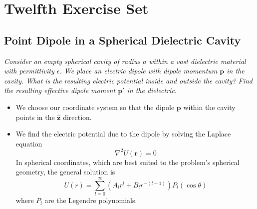 \documentclass[11pt, a4paper]{article}
\renewcommand{\vec}[1]{\bm{#1}} %
\newcommand{\uvec}[1]{\hat{\vec{#1}}} %
\renewcommand{\r}{\vec{r}}
\newcommand{\e}{\epsilon}
\newcommand{\pe}{\vec{p}}  %
\renewcommand{\laplacian}{\nabla^{2}}
\begin{document}
\section{Twelfth Exercise Set}
\subsection{Point Dipole in a Spherical Dielectric Cavity}
\textit{Consider an empty spherical cavity of radius $ a $ within a vast dielectric material with permittivity $ \e $. We place an electric dipole with dipole momentum $ \pe $ in the cavity. What is the resulting electric potential inside and outside the cavity? Find the resulting effective dipole moment $ \pe' $ in the dielectric.}
\begin{itemize}
	\item  We choose our coordinate system so that the dipole $ \pe $ within the cavity points in the $ \uvec{z} $ direction.
	
	
	\item We find the electric potential due to the dipole by solving the Laplace equation 
	\begin{equation*}
		\laplacian U(\r) = 0
	\end{equation*}
	In spherical coordinates, which are best suited to the problem's spherical geometry, the general solution is
	\begin{equation*}
		U(r) = \sum_{l = 0}^{\infty}(A_{l}r^{l} + B_{l}r^{-(l+1)})P_{l}(\cos \theta)
	\end{equation*}
	where $ P_{l} $ are the Legendre polynomials.
	

\end{itemize}
\end{document}
